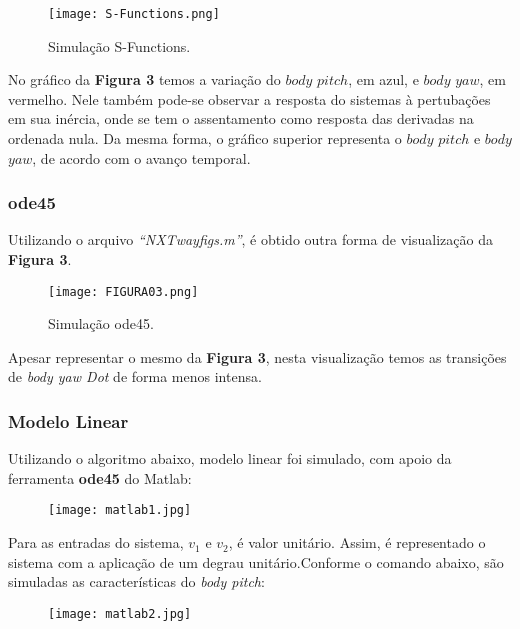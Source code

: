 \documentclass[12pt]{article}
\begin{document}
\begin{figure}[H] 
    \centering
    \texttt{[image: S-Functions.png]}
    \caption{Simulação S-Functions.}
    \label{fig:mesh3}
\end{figure}

\quad No gráfico da \textbf{Figura 3} temos a variação do $body$ $pitch$, em azul, e $body$ $yaw$, em vermelho. Nele também pode-se observar a resposta do sistemas à pertubações em sua inércia, onde se tem o assentamento como resposta das derivadas na ordenada nula. Da mesma forma, o gráfico superior representa o $body$ $pitch$ e $body$ $yaw$, de acordo com o avanço temporal.

\subsubsection{ode45}

\quad Utilizando o arquivo \emph{“NXTway\underline{\hspace{.1in}}figs.m”}, é obtido outra forma de visualização da \textbf{Figura 3}.

\begin{figure}[H] 
    \centering
    \texttt{[image: FIGURA03.png]}
    \caption{Simulação ode45.}
    \label{fig:mesh3}
\end{figure}

\quad Apesar representar o mesmo da \textbf{Figura 3}, nesta visualização temos as transições de \emph{body yaw Dot} de forma menos intensa. 

\subsubsection{Modelo Linear}

\quad Utilizando o algoritmo abaixo, modelo linear foi simulado, com apoio da ferramenta \textbf{ode45} do Matlab:

\begin{figure}[H] 
    \centering
    \texttt{[image: matlab1.jpg]}
    \label{fig:mesh6}
\end{figure}


\quad Para as entradas do sistema, $v_1$ e $v_2$, é valor unitário. Assim, é representado o sistema com a aplicação de um degrau unitário.Conforme o comando abaixo, são simuladas as características do \emph{body pitch}:

\begin{figure}[H] 
    \centering
    \texttt{[image: matlab2.jpg]}
    \label{fig:mesh6}
\end{figure}
\end{document}
